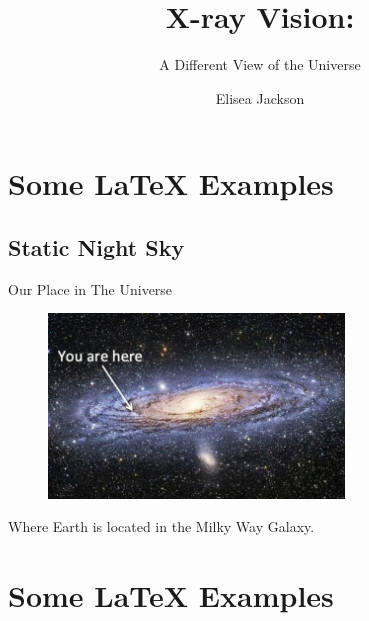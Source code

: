 \documentclass[12pt, aspectratio=169]{beamer}
\title{X-ray Vision:}
\subtitle{A Different View of the Universe}
\author{Elisea Jackson}
\begin{document}
\begin{frame}
  \titlepage
\end{frame}



\section{Some \LaTeX{} Examples}

\subsection{Static Night Sky}

\begin{frame}{Our Place in The Universe}
  
\begin{figure}
\includegraphics[width=0.7\textwidth]{we_here_gal_example.jpeg}
\end{figure}
\centering
Where Earth is located in the Milky Way Galaxy. 


\end{frame}

\section{Some \LaTeX{} Examples}
\end{document}
